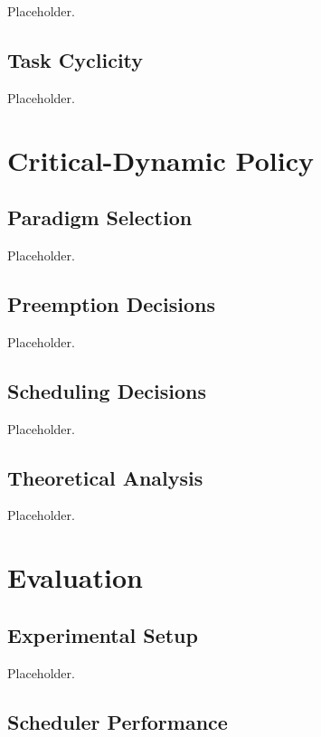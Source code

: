 \documentclass[conference]{IEEEtran}
\begin{document}
Placeholder.

\subsection{Task Cyclicity}

Placeholder.

\section{Critical-Dynamic Policy}

\subsection{Paradigm Selection}

Placeholder.

\subsection{Preemption Decisions}

Placeholder.

\subsection{Scheduling Decisions}

Placeholder.

\subsection{Theoretical Analysis}

Placeholder.

\section{Evaluation}

\subsection{Experimental Setup}

Placeholder.

\subsection{Scheduler Performance}
\end{document}

